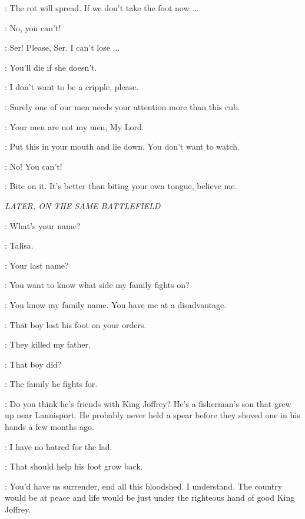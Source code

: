\TALISA: The rot will spread. If we don't take the foot now $\ldots$  

\WOUNDEDLANNISTER: No, you can't! 


\WOUNDEDLANNISTER: Ser! Please, Ser. I can't lose $\ldots$  

\ROBB: You'll die if she doesn't. 

\WOUNDEDLANNISTER: I don't want to be a cripple, please. 

\ROOSE: Surely one of our men needs your attention more than this cub. 

\TALISA: Your men are not my men, My Lord. 

\ROBB: Put this in your mouth and lie down. You don't want to watch. 

\WOUNDEDLANNISTER: No! You can't! 

\ROBB: Bite on it. It's better than biting your own tongue, believe me. 



\scene

\textit{LATER, ON THE SAME BATTLEFIELD} 


\ROBB: What's your name? 

\TALISA: Talisa. 

\ROBB: Your last name? 

\TALISA: You want to know what side my family fights on? 

\ROBB: You know my family name. You have me at a disadvantage. 

\TALISA: That boy lost his foot on your orders. 

\ROBB: They killed my father. 

\TALISA: That boy did? 

\ROBB: The family he fights for. 

\TALISA: Do you think he's friends with King Joffrey? He's a fisherman's son that grew up near Lannisport. He probably never held a spear before they shoved one in his hands a few months ago. 

\ROBB: I have no hatred for the lad. 

\TALISA: That should help his foot grow back. 

\ROBB: You'd have us surrender, end all this bloodshed. I understand. The country would be at peace and life would be just under the righteous hand of good King Joffrey. 

